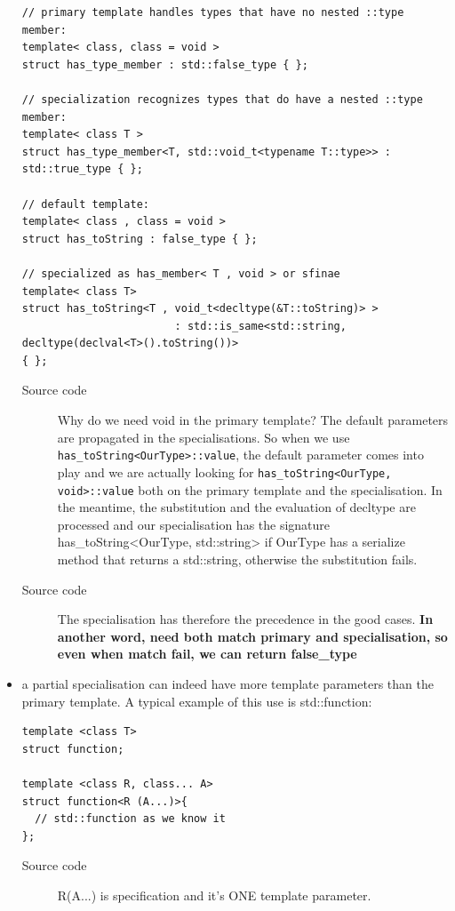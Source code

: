 \documentclass[a4paper,11pt,twoside]{book}
\begin{document}
\begin{itemize}
\begin{lstlisting}
// primary template handles types that have no nested ::type member:
template< class, class = void >
struct has_type_member : std::false_type { };
 
// specialization recognizes types that do have a nested ::type member:
template< class T >
struct has_type_member<T, std::void_t<typename T::type>> : std::true_type { };

// default template:
template< class , class = void >
struct has_toString : false_type { };

// specialized as has_member< T , void > or sfinae
template< class T>
struct has_toString<T , void_t<decltype(&T::toString)> > 
                        : std::is_same<std::string, decltype(declval<T>().toString())>
{ };
\end{lstlisting}

\begin{description}
    \item[Source code] Why do we need void in the primary template? The default parameters are propagated in the specialisations. So when we use \texttt{has\_toString<OurType>::value}, the default parameter comes into play and we are actually looking for \texttt{has\_toString<OurType, void>::value} both on the primary template and the specialisation. In the meantime, the substitution and the evaluation of decltype are processed and our specialisation has the signature has\_toString<OurType, std::string> if OurType has a serialize method that returns a std::string, otherwise the substitution fails. 

    \item[Source code] The specialisation has therefore the precedence in the good cases. \textbf{In another word, need both match primary and specialisation, so even when match fail, we can return false\_type}

\end{description}

\item a partial specialisation can indeed have more template parameters than the primary template. A typical example of this use is std::function: 
\begin{lstlisting}
template <class T>
struct function;

template <class R, class... A>
struct function<R (A...)>{
  // std::function as we know it
};
\end{lstlisting}	
\begin{description}
    \item[Source code] R(A...) is specification and it's ONE template parameter.
\end{description}

\end{itemize}
\end{document}
